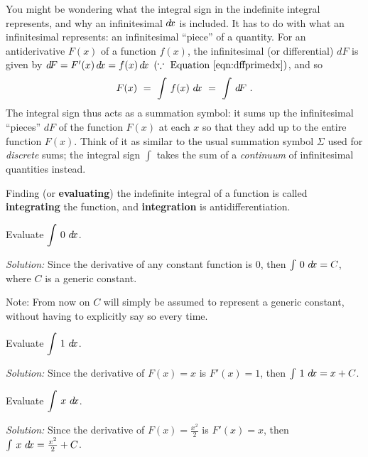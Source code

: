 \statecomment{\[
\ddx\,\left(\int\,f(x)~\dx\right) ~=~ f(x)
\]
}

You might be wondering what the integral sign in the indefinite integral
represents, and why an infinitesimal $d\!x$ is included. It has to do with what
an infinitesimal represents: an infinitesimal ``piece'' of a quantity. For an
antiderivative $F(x)$ of a function $f(x)$, the infinitesimal (or differential)
$d\!F$ is given by $d\!F = F'(x)\,d\!x = f(x)\,d\!x ~\left(\because~\text{Equation~\ref{eqn:dffprimedx}}\right)$, and so
\[
F(x) ~=~ \int\,f(x)~d\!x ~=~ \int\,d\!F ~.
\]
The integral sign thus acts as a summation symbol: it sums up the infinitesimal
``pieces'' $d\!F$ of the function $F(x)$ at each $x$ so that they add up to the
entire function $F(x)$. Think of it as similar to the usual summation symbol
$\Sigma$ used for \emph{discrete} sums; the integral sign $\int$ takes the sum
of a \emph{continuum} of infinitesimal quantities instead.

Finding (or \textbf{evaluating}) the indefinite integral of a function is
called \textbf{integrating} the function, and
\textbf{integration} is antidifferentiation.

\begin{exmp}\label{exmp:antideriv1}
\noindent Evaluate $\displaystyle\int\,0~d\!x$.\vspace{1mm}
\par\noindent\emph{Solution:} Since the derivative of any constant function is
0, then $\int\,0~d\!x = C$, where $C$ is a generic constant.\vspace{2mm}

\noindent Note: From now on $C$ will simply be assumed to represent a generic
constant, without having to explicitly say so every time.
\end{exmp}
\begin{exmp}\label{exmp:antideriv2}
\noindent Evaluate $\displaystyle\int\,1~d\!x$.\vspace{1mm}
\par\noindent\emph{Solution:} Since the derivative of $F(x) = x$ is
$F'(x) = 1$, then $\int\,1~d\!x = x + C$.
\end{exmp}
\begin{exmp}\label{exmp:antideriv3}
\noindent Evaluate $\displaystyle\int\,x~d\!x$.\vspace{1mm}
\par\noindent\emph{Solution:} Since the derivative of $F(x) = \frac{x^2}{2}$ is
$F'(x) = x$, then $\int\,x~d\!x = \frac{x^2}{2} + C$.
\end{exmp}
\divider
\vspace{3mm}

